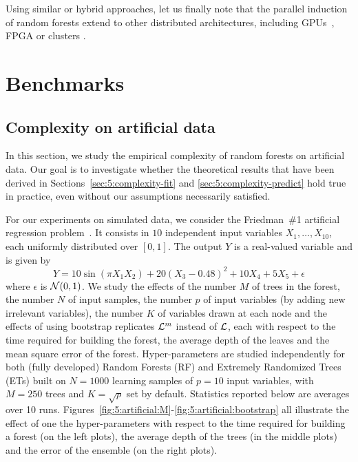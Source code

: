 Using similar or hybrid approaches, let us finally note that the parallel
induction of random forests extend to other distributed architectures,
including GPUs~\citep{sharp:2008,liao:2013}, FPGA \citep{narayanan:2007} or
clusters \citep{mitchell:2011}.

\section{Benchmarks}
\label{sec:5:benchmarks}

\subsection{Complexity on artificial data}
\label{sec:5:benchmarks:artificial}

In this section, we study the empirical complexity of random
forests on artificial data. Our goal is to investigate whether the
theoretical results that have been derived in Sections~\ref{sec:5:complexity-fit}
and \ref{sec:5:complexity-predict} hold true in practice, even without
our assumptions necessarily satisfied.

For our experiments on simulated data, we consider the Friedman~\#1 artificial
regression problem~\citep{friedman:1991}. It consists in $10$ independent
input variables $X_1, \dots, X_{10}$, each uniformly distributed over $[0,1]$.
The output $Y$ is a real-valued variable and is given by
\begin{equation}
Y = 10 \sin(\pi X_1 X_2) + 20(X_3 - 0.48)^2 + 10 X_4 + 5 X_5 + \epsilon
\end{equation}
where $\epsilon$ is ${\cal N}(0, 1)$. We study the effects of the number $M$ of
trees in the forest, the number $N$ of input samples, the number $p$ of input
variables (by adding new irrelevant variables), the number $K$ of variables drawn at each node and the effects of
using bootstrap replicates ${\cal L}^m$ instead of ${\cal L}$, each with respect to
the time required for building the forest, the average depth of the leaves and
the mean square error of the forest. Hyper-parameters are studied independently
for both (fully developed) Random Forests (RF) and Extremely Randomized Trees (ETs) built
on $N=1000$ learning samples of $p=10$ input variables, with $M=250$ trees and $K=\sqrt{p}$ set by
default. Statistics reported below are averages over 10 runs. Figures~\ref{fig:5:artificial:M}-\ref{fig:5:artificial:bootstrap}
all illustrate the effect of one the hyper-parameters with respect to the time required for building
a forest (on the left plots), the average depth of the trees (in the middle plots)
and the error of the ensemble (on the right plots).

